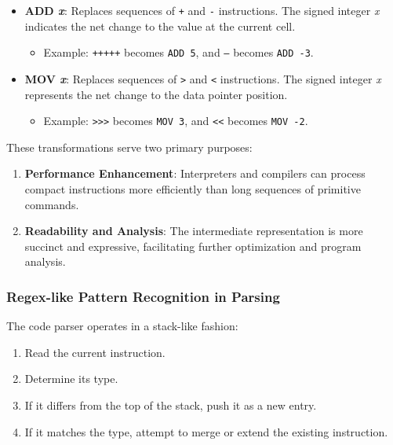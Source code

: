 \begin{itemize}
    \item \textbf{ADD \textit{x}}: Replaces sequences of \texttt{+} and \texttt{-} instructions. The signed integer \textit{x} indicates the net change to the value at the current cell.
    \begin{itemize}
        \item Example: \texttt{+++++} becomes \texttt{ADD 5}, and \texttt{---} becomes \texttt{ADD -3}.
    \end{itemize}

    \item \textbf{MOV \textit{x}}: Replaces sequences of \texttt{>} and \texttt{<} instructions. The signed integer \textit{x} represents the net change to the data pointer position.
    \begin{itemize}
        \item Example: \texttt{>>>} becomes \texttt{MOV 3}, and \texttt{<<} becomes \texttt{MOV -2}.
    \end{itemize}
\end{itemize}

\par These transformations serve two primary purposes:

\begin{enumerate}
    \item \textbf{Performance Enhancement}: Interpreters and compilers can process compact instructions more efficiently than long sequences of primitive commands.
    \item \textbf{Readability and Analysis}: The intermediate representation is more succinct and expressive, facilitating further optimization and program analysis.
\end{enumerate}

\subsubsection*{Regex-like Pattern Recognition in Parsing}

\par The code parser operates in a stack-like fashion:

\begin{enumerate}
    \item Read the current instruction.
    \item Determine its type.
    \item If it differs from the top of the stack, push it as a new entry.
    \item If it matches the type, attempt to merge or extend the existing instruction.
\end{enumerate}

